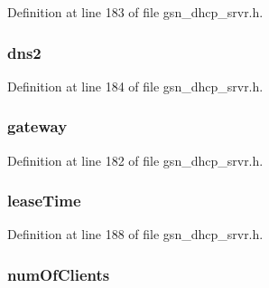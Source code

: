 Definition at line 183 of file gsn\_\-dhcp\_\-srvr.h.

\hypertarget{a00044_a0c87d9079482808f8e8ae6ed329547a3}{
\subsubsection[{dns2}]{ {\bf dns2}}}
\label{a00044_a0c87d9079482808f8e8ae6ed329547a3}


Definition at line 184 of file gsn\_\-dhcp\_\-srvr.h.

\hypertarget{a00044_a1305b67d400967bbebc27842a0d34ab7}{
\subsubsection[{gateway}]{ {\bf gateway}}}
\label{a00044_a1305b67d400967bbebc27842a0d34ab7}


Definition at line 182 of file gsn\_\-dhcp\_\-srvr.h.

\hypertarget{a00044_abad371550e06d9d8f1eab19c6ce4cf80}{
\subsubsection[{leaseTime}]{ {\bf leaseTime}}}
\label{a00044_abad371550e06d9d8f1eab19c6ce4cf80}


Definition at line 188 of file gsn\_\-dhcp\_\-srvr.h.

\hypertarget{a00044_a90adf637fd2556c882bc825710d7829f}{
\subsubsection[{numOfClients}]{ {\bf numOfClients}}}
\label{a00044_a90adf637fd2556c882bc825710d7829f}



